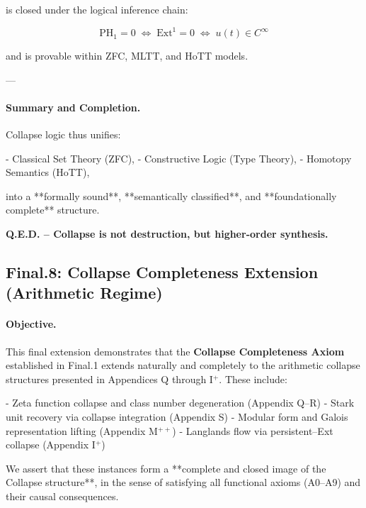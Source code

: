 \documentclass[11pt]{article}
\begin{document}
\begin{axiom}
\begin{axiom}
{{is closed under the logical inference chain:

\[
\boxed{
\mathrm{PH}_1 = 0 \;\Leftrightarrow\; \mathrm{Ext}^1 = 0 \;\Leftrightarrow\; u(t) \in C^\infty
}
\]

and is provable within ZFC, MLTT, and HoTT models.

---

\paragraph{Summary and Completion.}

Collapse logic thus unifies:

- Classical Set Theory (ZFC),
- Constructive Logic (Type Theory),
- Homotopy Semantics (HoTT),

into a **formally sound**, **semantically classified**, and **foundationally complete** structure.

\begin{center}
\textbf{Q.E.D. – Collapse is not destruction, but higher-order synthesis.}
\end{center}



\subsection*{Final.8: Collapse Completeness Extension (Arithmetic Regime)}

\paragraph{Objective.}  
This final extension demonstrates that the \textbf{Collapse Completeness Axiom} established in Final.1  
extends naturally and completely to the arithmetic collapse structures presented in Appendices Q through I$^+$.  
These include:  

- Zeta function collapse and class number degeneration (Appendix Q–R)  
- Stark unit recovery via collapse integration (Appendix S)  
- Modular form and Galois representation lifting (Appendix M$^{++}$)  
- Langlands flow via persistent–Ext collapse (Appendix I$^+$)

We assert that these instances form a **complete and closed image of the Collapse structure**,  
in the sense of satisfying all functional axioms (A0–A9) and their causal consequences.

}}
\end{axiom}
\end{axiom}
\end{document}
